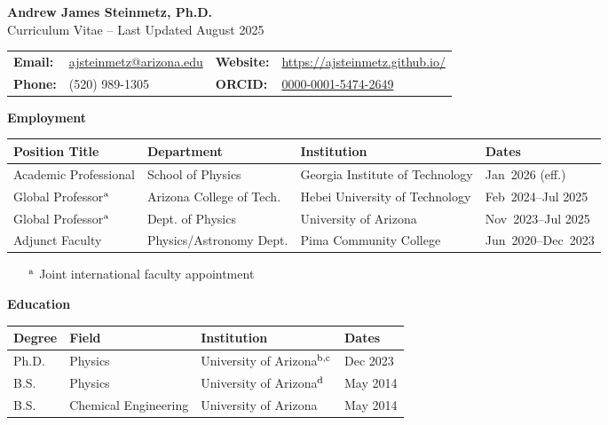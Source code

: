 \documentclass[11pt]{article}
\begin{document}
\begin{center}
    {\Large\textbf{Andrew James Steinmetz, Ph.D.}}\\[0.5em]
    {\large Curriculum Vitae -- Last Updated August 2025}
\end{center}

{\normalsize
\begin{center}
    \begin{tabular}{@{}p{2.0cm} p{5.0cm} p{2.0cm} p{5.0cm}@{}}
        \textbf{Email:} & \href{mailto:ajsteinmetz@arizona.edu}{ajsteinmetz@arizona.edu} &
        \textbf{Website:} & \href{https://ajsteinmetz.github.io/}{https://ajsteinmetz.github.io/} \\
        \textbf{Phone:} & (520) 989-1305 &
        \textbf{ORCID:} & \href{https://orcid.org/0000-0001-5474-2649}{0000-0001-5474-2649} \\
    \end{tabular}
\end{center}
}

\medskip

{\Large\textbf{Employment}}

{\normalsize
\begin{tabular}{@{}p{3.8cm} p{4.4cm} p{5.3cm} p{3.0cm}@{}}
    \toprule
    \textbf{Position Title} & \textbf{Department} & \textbf{Institution} & \textbf{Dates} \\
    \midrule
    Academic Professional & School of Physics & Georgia Institute of Technology & {\small Jan~2026 (eff.)} \\ 
    Global Professor\(^{\rm a}\) & Arizona College of Tech. & Hebei University of Technology & {\small Feb~2024--Jul 2025} \\
    Global Professor\(^{\rm a}\) & Dept. of Physics & University of Arizona              & {\small Nov~2023--Jul 2025} \\
    Adjunct Faculty  & Physics/Astronomy Dept. & Pima Community College       & {\small Jun~2020--Dec~2023} \\
    \bottomrule
\end{tabular}
}

\begin{itemize}[leftmargin=*,nosep]
    \item[\(^{\rm a}\)] {\small Joint international faculty appointment}
\end{itemize}

\medskip

{\Large\textbf{Education}}

{\normalsize
\begin{tabular}{@{}p{2.8cm} p{5.0cm} p{5.5cm} p{3.2cm}@{}}
    \toprule
    \textbf{Degree} & \textbf{Field} & \textbf{Institution} & \textbf{Dates} \\
    \midrule
    Ph.D. & Physics             & University of Arizona\(^{\rm b,c}\) & Dec 2023 \\
    B.S.   & Physics             & University of Arizona\(^{\rm d}\) & May 2014 \\
    B.S.   & Chemical Engineering& University of Arizona & May 2014 \\
    \bottomrule
\end{tabular}
}
\end{document}
